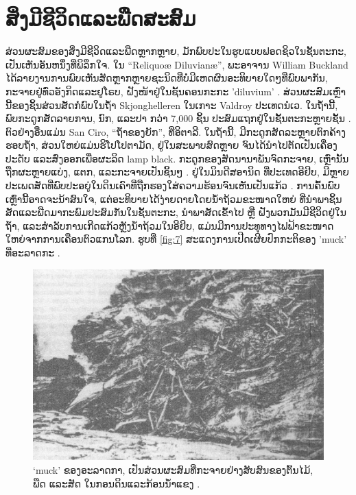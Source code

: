\documentclass[10pt,twocolumn,letterpaper]{article}
\begin{document}
\section{ສິ່ງມີຊີວິດແລະພືດສະສົມ}

ສ່ວນຜະສົມຂອງສິ່ງມີຊີວິດແລະພືດຫຼາກຫຼາຍ, ມັກພົບປະໃນຮູບແບບຟອດຊິວໃນຊັ້ນຕະກະ, ເປັນເຫັນອັນຫນຶ່ງທີ່ພິລຶກໃຈ. ໃນ “Reliquoæ Diluvianæ”, ພະອາຈານ William Buckland ໄດ້ລາຍງານການພົບເຫັນສັດຫຼາກຫຼາຍຊະນິດທີ່ບໍ່ມີເຫດຜົນອະທິບາຍໃດໆທີ່ພົບພາກັນ, ກະຈາຍຢູ່ທົ່ວອັງກິດແລະຢູໂຣບ, ຝັງໜ້າຢູ່ໃນຊັ້ນຄອນກະກະ 'diluvium' \cite{58}. ສ່ວນຜະສົມເຫຼົ່ານີ້ຂອງຊິ້ນສ່ວນສັດກໍພົບໃນຖ້ຳ Skjonghelleren ໃນເກາະ Valdroy ປະເທດນໍເວ. ໃນຖ້ຳນີ້, ພົບກະດູກສັດລາຍການ, ນົກ, ແລະປາ ກວ່າ 7,000 ຊິ້ນ ປະສົມແຖກຢູ່ໃນຊັ້ນຕະກະຫຼາຍຊັ້ນ \cite{59}. ຕົວຢ່າງອື່ນແມ່ນ San Ciro, “ຖ້ຳຂອງຍັກ”, ທີ່ອິຕາລີ. ໃນຖ້ຳນີ້, ມີກະດູກສັດລະຫຼາຍຕົກຄ້າງຮອບຖ້ຳ, ສ່ວນໃຫຍ່ແມ່ນຮິໂປໂປຕາມັດ, ຢູ່ໃນສະພາບສົດຫຼາຍ ຈົນໄດ້ນຳໄປຕັດເປັນເຄື່ອງປະດັບ ແລະສົ່ງອອກເພື່ອຜະລິດ lamp black. ກະດູກຂອງສັດນານາພັນຈົດກະຈາຍ, ເຫຼົ່ານັ້ນຖືກຜະຫຼາຍແບ່ງ, ແຕກ, ແລະກະຈາຍເປັນຊິ້ນໆ \cite{60,61}. ຢູ່ໃນມິນດີສອານິດ ທີ່ປະເທດອີຢິບ, ມີຫຼາຍປະເພດສັດທີ່ພົບປະອຍູ່ໃນດິນເຄົາທີ່ຖືກຮອງໃສ່ຄວາມຮ້ອນຈົນເຫັນເປັນແກ້ວ \cite{57}. ການຄົ້ນພົບເຫຼົ່ານີ້ອາດຈະນ້າສົນໃຈ, ແຕ່ອະທິບາຍໄດ້ງ່າຍດາຍໂດຍນໍ້າຖ້ວມຂະໜາດໃຫຍ່ ທີ່ນຳພາຊິ້ນສັດແລະພືດມາກະພົມປະສົມກັນໃນຊັ້ນຕະກະ, ນຳພາສັດເຂົ້າໄປ ຫຼື ຝັງພວກມັນມີຊີວິດຢູ່ໃນຖ້ຳ, ແລະສໍາລັບການເກີດແກ້ວຫຼັງນ້ຳຖ້ວມໃນອີຢິບ, ແມ່ນມີການປະທຸທາງໄຟຟ້າຂະໜາດໃຫຍ່ຈາກການເຄືອນຕົວແກນໂລກ. ຮູບທີ່ \ref{fig:7} ສະແດງການເປີດເຜີຍປົກກະຕິຂອງ 'muck' ທີ່ອະລາດກະ \cite{56}.

\begin{figure}[t]
\begin{center}
   \includegraphics[width=1\linewidth]{muck-crop.jpeg}
\end{center}
   \caption{‘muck’ ຂອງອະລາດກາ, ເປັນສ່ວນຜະສົມທີ່ກະຈາຍຢ່າງສັບສົນຂອງຕົ້ນໄມ້, ພືດ ແລະສັດ ໃນກອນດິນແລະກ້ອນນ້ຳແຂງ \cite{146}.}
\label{fig:7}
\label{fig:onecol}
\end{figure}
\end{document}
